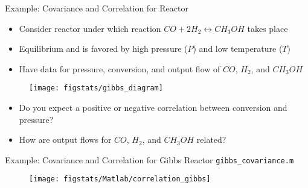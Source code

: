 \documentclass[9pt]{beamer}
\begin{document}
%
\begin{frame}{Example: Covariance and Correlation for Reactor}

\begin{itemize}
\setlength{\itemsep}{5pt}
\item Consider reactor under which reaction $CO+2H_2\leftrightarrow CH_3OH$ takes place
\item Equilibrium and is favored by high pressure ($P$) and low temperature ($T$)
\item Have data for pressure, conversion, and output flow of $CO$, $H_2$, and $CH_3OH$
\end{itemize}

\begin{figure}[!htb]
    \centering
	\texttt{[image: figstats/gibbs\_diagram]}
\end{figure}

\begin{block}{}
\begin{itemize}
\item Do you expect a positive or negative correlation between conversion and pressure?
 \item How are output flows for $CO$, $H_2$, and $CH_3OH$ related?
\end{itemize}
\end{block}

\end{frame}


%
\begin{frame}{Example: Covariance and Correlation for Gibbs Reactor \footnotesize{\texttt{gibbs\_covariance.m}}}


\begin{figure}[!htb]
    \centering
	\texttt{[image: figstats/Matlab/correlation\_gibbs]}
\end{figure}



\end{frame}
\end{document}
